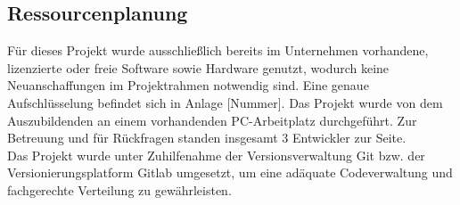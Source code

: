 \subsection{Ressourcenplanung}
    Für dieses Projekt wurde ausschließlich bereits im Unternehmen vorhandene, lizenzierte oder freie Software sowie Hardware genutzt, wodurch keine Neuanschaffungen im Projektrahmen notwendig sind. Eine genaue Aufschlüsselung befindet sich in Anlage [Nummer]. Das Projekt wurde von dem Auszubildenden an einem vorhandenden PC-Arbeitplatz durchgeführt. Zur Betreuung und für Rückfragen standen insgesamt 3 Entwickler zur Seite.\\
    Das Projekt wurde unter Zuhilfenahme der Versionsverwaltung Git bzw. der Versionierungsplatform Gitlab umgesetzt, um eine adäquate Codeverwaltung und fachgerechte Verteilung zu gewährleisten.

\vfill